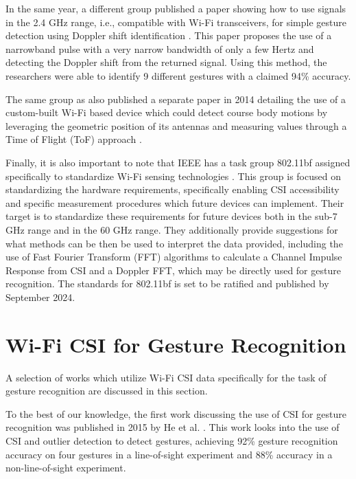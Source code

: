 In the same year, a different group published a paper showing how to use signals in the 2.4 GHz range, i.e., compatible with Wi-Fi transceivers, for simple gesture detection using Doppler shift identification \cite{pu2013whole}.
This paper proposes the use of a narrowband pulse with a very narrow bandwidth of only a few Hertz and detecting the Doppler shift from the returned signal.
Using this method, the researchers were able to identify 9 different gestures with a claimed 94\% accuracy.

The same group as \cite{adib2013see} also published a separate paper in 2014 detailing the use of a custom-built Wi-Fi based device which could detect course body motions by leveraging the geometric position of its antennas and measuring values through a Time of Flight (ToF) approach \cite{adib20143d}.

Finally, it is also important to note that IEEE has a task group 802.11bf assigned specifically to standardize Wi-Fi sensing technologies \cite{du2022overview}.
This group is focused on standardizing the hardware requirements, specifically enabling CSI accessibility and specific measurement procedures which future devices can implement.
Their target is to standardize these requirements for future devices both in the sub-7 GHz range and in the 60 GHz range.
They additionally provide suggestions for what methods can be then be used to interpret the data provided, including the use of Fast Fourier Transform (FFT) algorithms to calculate a Channel Impulse Response from CSI and a Doppler FFT, which may be directly used for gesture recognition.
The standards for 802.11bf is set to be ratified and published by September 2024.

\section{Wi-Fi CSI for Gesture Recognition}\label{sec:literature-csi-for-gesture}

A selection of works which utilize Wi-Fi CSI data specifically for the task of gesture recognition are discussed in this section.

To the best of our knowledge, the first work discussing the use of CSI for gesture recognition was published in 2015 by He et al. \cite{he2015wig}.
This work looks into the use of CSI and outlier detection to detect gestures, achieving 92\% gesture recognition accuracy on four gestures in a line-of-sight experiment and 88\% accuracy in a non-line-of-sight experiment.


